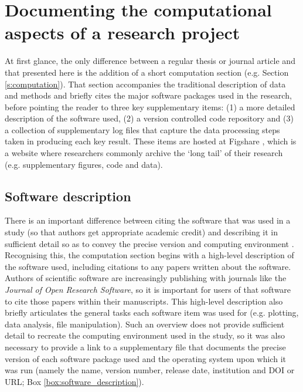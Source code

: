   
\section{Documenting the computational aspects of a research project}\label{s:reproducibility_approach}

At first glance, the only difference between a regular thesis or journal article and that presented here is the addition of a short computation section (e.g. Section \ref{s:computation}). That section accompanies the traditional description of data and methods and briefly cites the major software packages used in the research, before pointing the reader to three key supplementary items: (1) a more detailed description of the software used, (2) a version controlled code repository and (3) a collection of supplementary log files that capture the data processing steps taken in producing each key result. These items are hosted at Figshare \citep{IrvingFigshare2016}, which is a website where researchers commonly archive the `long tail' of their research (e.g. supplementary figures, code and data). 

\subsection{Software description}

There is an important difference between citing the software that was used in a study (so that authors get appropriate academic credit) and describing it in sufficient detail so as to convey the precise version and computing environment \citep{Jackson2012}. Recognising this, the computation section begins with a high-level description of the software used, including citations to any papers written about the software. Authors of scientific software are increasingly publishing with journals like the \textit{Journal of Open Research Software}, so it is important for users of that software to cite those papers within their manuscripts. This high-level description also briefly articulates the general tasks each software item was used for (e.g. plotting, data analysis, file manipulation). Such an overview does not provide sufficient detail to recreate the computing environment used in the study, so it was also necessary to provide a link to a supplementary file that documents the precise version of each software package used and the operating system upon which it was run (namely the name, version number, release date, institution and DOI or URL; Box \ref{box:software_description}). 

